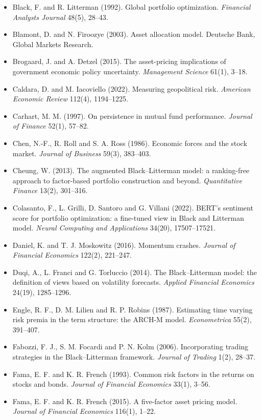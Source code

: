{\begin{itemize}[leftmargin=1.2em,itemsep=0.25em,label={}]
\item Black, F. and R. Litterman (1992). Global portfolio optimization. \textit{Financial Analysts Journal} 48(5), 28--43.
\item Blamont, D. and N. Firoozye (2003). Asset allocation model. Deutsche Bank, Global Markets Research.
\item Brogaard, J. and A. Detzel (2015). The asset-pricing implications of government economic policy uncertainty. \textit{Management Science} 61(1), 3--18.
\item Caldara, D. and M. Iacoviello (2022). Measuring geopolitical risk. \textit{American Economic Review} 112(4), 1194--1225.
\item Carhart, M. M. (1997). On persistence in mutual fund performance. \textit{Journal of Finance} 52(1), 57--82.
\item Chen, N.-F., R. Roll and S. A. Ross (1986). Economic forces and the stock market. \textit{Journal of Business} 59(3), 383--403.
\item Cheung, W. (2013). The augmented Black--Litterman model: a ranking-free approach to factor-based portfolio construction and beyond. \textit{Quantitative Finance} 13(2), 301--316.
\item Colasanto, F., L. Grilli, D. Santoro and G. Villani (2022). BERT's sentiment score for portfolio optimization: a fine-tuned view in Black and Litterman model. \textit{Neural Computing and Applications} 34(20), 17507--17521.
\item Daniel, K. and T. J. Moskowitz (2016). Momentum crashes. \textit{Journal of Financial Economics} 122(2), 221--247.
\item Duqi, A., L. Franci and G. Torluccio (2014). The Black--Litterman model: the definition of views based on volatility forecasts. \textit{Applied Financial Economics} 24(19), 1285--1296.
\item Engle, R. F., D. M. Lilien and R. P. Robins (1987). Estimating time varying risk premia in the term structure: the ARCH-M model. \textit{Econometrica} 55(2), 391--407.
\item Fabozzi, F. J., S. M. Focardi and P. N. Kolm (2006). Incorporating trading strategies in the Black--Litterman framework. \textit{Journal of Trading} 1(2), 28--37.
\item Fama, E. F. and K. R. French (1993). Common risk factors in the returns on stocks and bonds. \textit{Journal of Financial Economics} 33(1), 3--56.
\item Fama, E. F. and K. R. French (2015). A five-factor asset pricing model. \textit{Journal of Financial Economics} 116(1), 1--22.

\end{itemize}}
